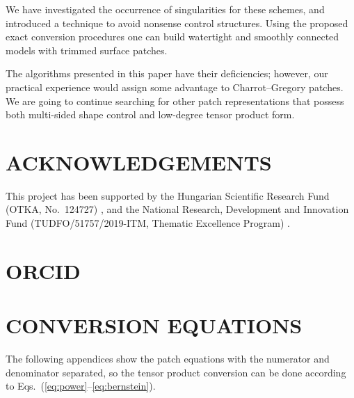 \documentclass[9pt,academicons]{article}
\begin{document}
We have investigated the occurrence of singularities for these schemes,
and introduced a technique to avoid nonsense control structures.
Using the proposed exact conversion procedures one can build watertight
and smoothly connected models with trimmed surface patches.

The algorithms presented in this paper have their deficiencies; however, our
practical experience would assign some advantage to Charrot--Gregory
patches. We are going to continue searching for other patch representations
that possess both multi-sided shape control and low-degree tensor product form.

\section*{ACKNOWLEDGEMENTS}
This project has been supported by the Hungarian Scientific Research Fund (OTKA, No.~124727)%
, and the National Research, Development and Innovation Fund (TUDFO/51757/2019-ITM,
Thematic Excellence Program)%
.

\section*{ORCID}

\appendix
\section{CONVERSION EQUATIONS}
\label{app:conversion-eqs}
The following appendices show the patch equations
with the numerator and denominator separated,
so the tensor product conversion can be done
according to Eqs.~(\ref{eq:power}--\ref{eq:bernstein}).
\end{document}
